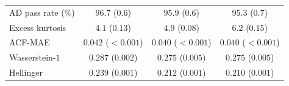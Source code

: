 \begin{table}[tbp]
\begin{tabular}{@{}lccc@{}}
AD pass rate (\%)   & $\mathbf{96.7}$ ($0.6$) &  $95.9$ ($0.6$)         &  $95.3$ ($0.7$) \\
Excess kurtosis     &   $4.1$ ($0.13$)        &   $4.9$ ($0.08$)        & $\mathbf{6.2}$ ($0.15$) \\
ACF-MAE             & $0.042$ ($<\!0.001$)    & $\mathbf{0.040}$ ($<\!0.001$) & $\mathbf{0.040}$ ($<\!0.001$) \\
Wasserstein-$1$     & $0.287$ ($0.002$)       & $\mathbf{0.275}$ ($0.005$) & $\mathbf{0.275}$ ($0.005$) \\
Hellinger           & $0.239$ ($0.001$)       & $0.212$ ($0.001$)       & $\mathbf{0.210}$ ($0.001$) \\
\bottomrule
\end{tabular}
\end{table}


\begin{table}[tbp]
  \centering
  \caption{\textbf{Hybrid composition method broken out by branch.}
    $N_{\mathrm{tickers}}$: number of tickers assigned to each branch by
    the $R^2_{\mathrm{preserve}} = 0.80$ threshold. The clipped
    variance-preserving branch does not trigger anywhere in the
    universe ($\rho_i < 0.90$ for all tickers) and is omitted. The
    two trackers in the $R^2$-preserving branch (QQQ and SPYG) had
    median absolute errors of $0.005$ for $\beta$ and $0.001$ for
    $R^2$, with a KS pass rate of $100\%$.}
  \label{tab:branch}
  \small
  \resizebox{\textwidth}{!}{}
\end{table}


